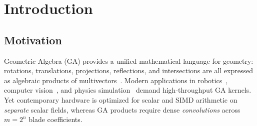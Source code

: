 \documentclass[11pt,a4paper]{article}
\theoremstyle{definition}
\theoremstyle{plain}
\theoremstyle{remark}
\newcommand{\GA}{\mathbb{G}}
\begin{document}
\begin{abstract}
\begin{enumerate}[leftmargin=*, label=\arabic{enumi}.]
  \item \textbf{Quantization optimality} (Theorem~\ref{thm:quant}): necessary and sufficient conditions for lossless input mapping, and a polynomial-time algorithm for optimal scale selection under fixed bit budget.

  \item \textbf{Format comparison} (Theorem~\ref{thm:format}): a closed-form equivalence between L-Rep guard-bit requirements and quire accumulator sizes under posit arithmetic.
\end{enumerate}

Empirically, we validate via Verilator RTL simulation ($n\le 6$, exhaustive corner-case test vectors), Python big-integer reference model, and synthesis runs on Xilinx Artix-7 and Intel Cyclone V FPGAs.  Key benchmark results: for $\GA(3,0,1)$ (PGA, $m=16$), L-Rep achieves throughput of $2.3\times$ over conventional struct-of-arrays layout at $100\,\text{MHz}$ with $\le 128\,\text{bits}$ total storage per multivector; for $\GA(4,1,0)$ (CGA, $m=32$), L-Rep requires $256\,\text{bits}$ storage and achieves $1.7\times$ throughput improvement.  All artifacts (RTL, Python, test vectors, LaTeX source) are publicly available.
\end{abstract}

\tableofcontents
\newpage

\section{Introduction}
\label{sec:intro}

\subsection{Motivation}

Geometric Algebra (GA) provides a unified mathematical language for geometry: rotations, translations, projections, reflections, and intersections are all expressed as algebraic products of multivectors~\cite{hestenes1984,dorst2007}. Modern applications in robotics~\cite{selig2005}, computer vision~\cite{lasenby1998}, and physics simulation~\cite{doran2003} demand high-throughput GA kernels. Yet contemporary hardware is optimized for scalar and SIMD arithmetic on \emph{separate} scalar fields, whereas GA products require dense \emph{convolutions} across $m=2^n$ blade coefficients.
\end{document}
